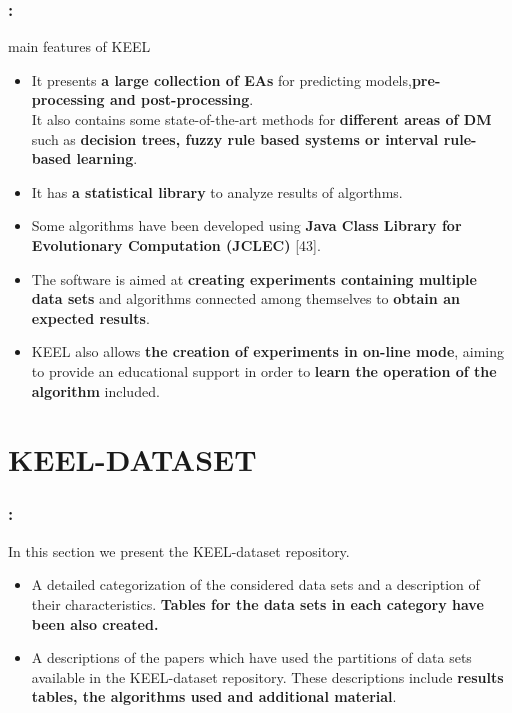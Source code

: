 \documentclass{beamer}
\begin{document}
\begin{CJK*}{UTF8}{bsmi}
\begin{frame}
	\frametitle{\insertsection : \insertsubsection}
	\begin{block}{main features of KEEL }
		\begin{itemize}
			\item  It presents \textbf{a large collection of EAs} for predicting models,\textbf{pre-processing  and post-processing}. 
			\\It also contains some state-of-the-art methods for\textbf{ different areas of DM} such as\textbf{ decision trees, fuzzy rule based systems or interval rule-based learning}.
			\item It has \textbf{a statistical library} to analyze results of algorthms.
			\item Some algorithms have been developed using \textbf{Java Class Library for Evolutionary Computation (JCLEC)} [43].
			\item The software is aimed at \textbf{creating experiments containing multiple data sets} and algorithms connected among themselves to \textbf{obtain an expected results}.
			\item KEEL also allows \textbf{the creation of experiments in on-line mode}, aiming to provide an educational support in order to \textbf{learn the operation of the algorithm} included.
		\end{itemize}
	\end{block}
\end{frame}

\section{KEEL-DATASET} 

\begin{frame}
	\frametitle{\insertsection : \insertsubsection}
	\begin{block}{In this section we present the KEEL-dataset repository. }
		\begin{itemize}
			\item A detailed categorization of the considered data sets and a description of their characteristics. \textbf{Tables for the data sets in each category have been also created.}
			\item A descriptions of the papers which have used the partitions of data sets available in the KEEL-dataset repository. These descriptions include \textbf{results tables, the algorithms used and additional material}.
		\end{itemize}
	\end{block}
\end{frame}


\end{CJK*}
\end{document}
